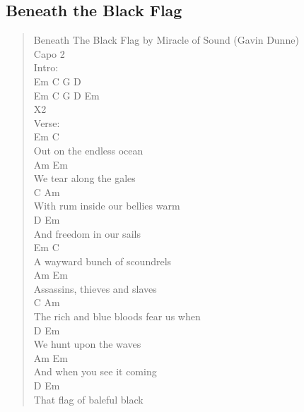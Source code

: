\documentclass[11pt]{article}
\begin{document}
\subsection{Beneath the Black Flag}
\label{sec:orgc99109e}
\begin{verse}
Beneath The Black Flag by Miracle of Sound (Gavin Dunne)\\
\vspace*{1em}
Capo 2\\
Intro:\\
Em   C   G   D\\
Em   C   G D Em\\
\hspace*{16em}X2\\
Verse:\\
\hspace*{4em}Em             C\\
Out on the endless ocean\\
\hspace*{3em}Am             Em\\
We tear along the gales\\
\hspace*{5em}C              Am\\
With rum inside our bellies warm\\
D              Em\\
And freedom in our sails\\
\vspace*{1em}
\hspace*{2em}Em               C\\
A wayward bunch of scoundrels\\
\hspace*{2em}Am                   Em\\
Assassins, thieves and slaves\\
\hspace*{4em}C                    Am\\
The rich and blue bloods fear us when\\
\hspace*{3em}D             Em\\
We hunt upon the waves\\
\vspace*{1em}
Am              Em\\
And when you see it coming\\
\hspace*{5em}D               Em\\
That flag of baleful black\\

\end{verse}
\end{document}
